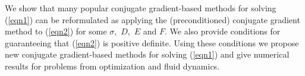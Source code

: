 \documentclass{report}
\begin{document}
We show that many popular conjugate gradient-based methods for solving
(\ref{eqn1}) can be reformulated as applying the (preconditioned)
conjugate gradient method to (\ref{eqn2}) for some $\sigma,$ $D,$ $E$ and
$F.$ We also provide conditions for guaranteeing that (\ref{eqn2}) is
positive definite. Using these conditions we propose new conjugate
gradient-based methods for solving (\ref{eqn1}) and give numerical
results for problems from optimization and fluid dynamics.
\end{document}
